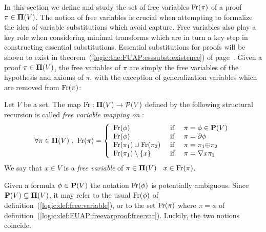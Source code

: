 In this section we define and study the set of free variables
$\mbox{\rm Fr}(\pi)$ of a proof $\pi\in\mbox{${\bf\Pi}(V)$}$. The notion of free variables
is crucial when attempting to formalize the idea of variable
substitutions which avoid capture. Free variables also play a key
role when considering minimal transforms which are in turn a key
step in constructing essential substitutions. Essential
substitutions for proofs will be shown to exist in
theorem~(\ref{logic:the:FUAP:esssubst:existence}) of
page~\pageref{logic:the:FUAP:esssubst:existence}. Given a proof
$\pi\in\mbox{${\bf\Pi}(V)$}$, the free variables of $\pi$ are simply the free
variables of the hypothesis and axioms of $\pi$, with the exception
of generalization variables which are removed from $\mbox{\rm Fr}(\pi)$:

\begin{defin}\label{logic:def:FUAP:freevarproof:free:var}
Let $V$ be a set. The map $\mbox{\rm Fr}:\mbox{${\bf\Pi}(V)$}\to {\cal P}(V)$ defined by the
following structural recursion is called {\em free variable mapping
on \pvs}:
 \begin{equation}\label{logic:eqn:FUAP:freevarproof:free:var:1}
    \forall\pi\in\pvs\ ,\ \free(\pi)=\left\{
                    \begin{array}{lcl}
                    \free(\phi)&\mbox{\ if\ }&\pi=\phi\in\pv\\
                    \free(\phi)&\mbox{\ if\ }&\pi=\axi\phi\\
                    \free(\pi_{1})\cup\free(\pi_{2}) &\mbox{\ if\ }&\pi=\pi_{1}\pon\pi_{2}\\
                    \free(\pi_{1})\setminus\{x\}&\mbox{\ if\ }&\pi=\gen x\pi_{1}
                    \end{array}\right.
    \end{equation}
We say that $x\in V$ is a {\em free variable} of $\pi\in\mbox{${\bf\Pi}(V)$}$
\ifand\ $x\in\mbox{\rm Fr}(\pi)$.
\end{defin}
Given a formula $\phi\in\mbox{${\bf P}(V)$}$ the notation $\mbox{\rm Fr}(\phi)$ is
potentially ambiguous. Since $\mbox{${\bf P}(V)$}\subseteq\mbox{${\bf\Pi}(V)$}$, it may refer to the
usual $\mbox{\rm Fr}(\phi)$ of definition~(\ref{logic:def:free:variable}),
or to the set $\mbox{\rm Fr}(\pi)$ where $\pi=\phi$ of
definition~(\ref{logic:def:FUAP:freevarproof:free:var}). Luckily,
the two notions coincide.

